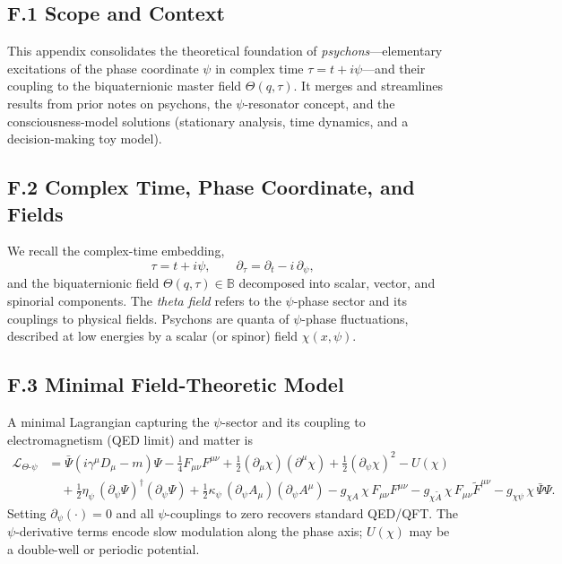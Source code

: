 \subsection*{F.1 Scope and Context}
This appendix consolidates the theoretical foundation of \emph{psychons}---elementary excitations of the phase coordinate $\psi$ in complex time $\tau=t+i\psi$---and their coupling to the biquaternionic master field $\Theta(q,\tau)$. It merges and streamlines results from prior notes on psychons, the $\psi$-resonator concept, and the consciousness-model solutions (stationary analysis, time dynamics, and a decision-making toy model).

\subsection*{F.2 Complex Time, Phase Coordinate, and Fields}
We recall the complex-time embedding,
\begin{equation}
\tau = t + i\psi,\qquad \partial_\tau = \partial_t - i\,\partial_\psi,
\end{equation}
and the biquaternionic field $\Theta(q,\tau)\in\mathbb{B}$ decomposed into scalar, vector, and spinorial components. The \emph{theta field} refers to the $\psi$-phase sector and its couplings to physical fields. Psychons are quanta of $\psi$-phase fluctuations, described at low energies by a scalar (or spinor) field $\chi(x,\psi)$.

\subsection*{F.3 Minimal Field-Theoretic Model}
A minimal Lagrangian capturing the $\psi$-sector and its coupling to electromagnetism (QED limit) and matter is
\begin{align}
\mathcal{L}_{\Theta\text{-}\psi} &= \bar{\Psi}(i\gamma^\mu D_\mu - m)\Psi - \frac{1}{4}F_{\mu\nu}F^{\mu\nu}
+ \frac{1}{2}(\partial_\mu \chi)(\partial^\mu \chi) + \frac{1}{2}(\partial_\psi \chi)^2 - U(\chi) \nonumber\\
&\quad + \frac{1}{2}\eta_\psi\,(\partial_\psi \Psi)^\dagger(\partial_\psi \Psi)
+ \frac{1}{2}\kappa_\psi\,(\partial_\psi A_\mu)(\partial_\psi A^\mu)
- g_{\chi A}\,\chi\,F_{\mu\nu}F^{\mu\nu}
- g_{\chi \tilde{A}}\,\chi\,F_{\mu\nu}\tilde{F}^{\mu\nu}
- g_{\chi \psi}\,\chi\,\bar{\Psi}\Psi.
\end{align}
Setting $\partial_\psi(\cdot)=0$ and all $\psi$-couplings to zero recovers standard QED/QFT. The $\psi$-derivative terms encode slow modulation along the phase axis; $U(\chi)$ may be a double-well or periodic potential.

